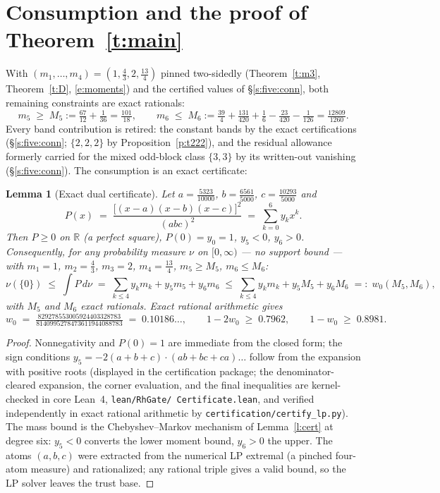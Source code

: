 \documentclass[11pt]{article}
\numberwithin{equation}{section}
\newtheorem{lemma}[theorem]{Lemma}
\theoremstyle{definition}
\theoremstyle{remark}
\begin{document}
\section{Consumption and the proof of
Theorem~\ref{t:main}}\label{s:lp}

With $(m_1,\dots,m_4)=(1,\tfrac43,2,\tfrac{13}4)$ pinned
two-sidedly (Theorem~\ref{t:m3}, Theorem~\ref{t:D},
\eqref{e:moments}) and the certified values of
\S\ref{s:five:conn}, both remaining constraints are exact
rationals:
\[
m_5\;\ge\;M_5:=\tfrac{67}{12}+\tfrac1{36}=\tfrac{101}{18},
\qquad
m_6\;\le\;M_6:=\tfrac{39}4+\tfrac{131}{420}
+\tfrac16-\tfrac{23}{420}-\tfrac1{126}
=\tfrac{12809}{1260}.
\]
Every band contribution is retired: the constant bands by the
exact certifications (\S\ref{s:five:conn}; $\{2,2,2\}$ by
Proposition~\ref{p:t222}),
and the residual allowance formerly carried for the mixed
odd-block class $\{3,3\}$ by its written-out vanishing
(\S\ref{s:five:conn}). The consumption is an exact
certificate:

\begin{lemma}[Exact dual certificate]\label{l:dual}
Let $a=\tfrac{5323}{10000}$, $b=\tfrac{6561}{5000}$,
$c=\tfrac{10293}{5000}$ and
\[
P(x)\;=\;\frac{\bigl[(x-a)(x-b)(x-c)\bigr]^{2}}{(abc)^{2}}
\;=\;\sum_{k=0}^{6}y_kx^{k}.
\]
Then $P\ge0$ on $\mathbb R$ (a perfect square), $P(0)=y_0=1$,
$y_5<0$, $y_6>0$. Consequently, for \emph{any} probability
measure $\nu$ on $[0,\infty)$ --- no support bound --- with
$m_1=1$, $m_2=\tfrac43$, $m_3=2$, $m_4=\tfrac{13}4$,
$m_5\ge M_5$, $m_6\le M_6$:
\[
\nu(\{0\})\;\le\;\int P\,d\nu
\;=\;\sum_{k\le4}y_km_k+y_5m_5+y_6m_6
\;\le\;\sum_{k\le4}y_km_k+y_5M_5+y_6M_6\;=:\;w_0(M_5,M_6),
\]
with $M_5$ and $M_6$ exact rationals. Exact rational
arithmetic gives
\[
w_0\;=\;
\tfrac{829278553005924403328783}{8140995278473611944088783}
\;=\;0.10186\ldots,
\qquad
1-2w_0\;\ge\;0.7962,\qquad 1-w_0\;\ge\;0.8981 .
\]
\end{lemma}

\begin{proof}
Nonnegativity and $P(0)=1$ are immediate from the closed form;
the sign conditions $y_5=-2(a{+}b{+}c)\cdot(ab{+}bc{+}ca)\ldots$
follow from the expansion with positive roots (displayed in the
certification package; the denominator-cleared expansion, the
corner evaluation, and the final inequalities are
kernel-checked in core Lean~4, \texttt{lean/RhGate/
Certificate.lean}, and verified independently in exact rational
arithmetic by \texttt{certification/certify\_lp.py}).
The mass bound is the Chebyshev--Markov mechanism of
Lemma~\ref{l:cert} at degree six: $y_5<0$ converts the lower
moment bound, $y_6>0$ the upper. The atoms $(a,b,c)$ were
extracted from the numerical LP extremal (a pinched four-atom
measure) and rationalized; any rational triple gives a valid
bound, so the LP solver leaves the trust base.
\end{proof}
\end{document}
